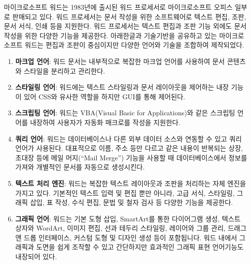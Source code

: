 \documentclass[
  letterpaper,
]{book}
\begin{document}
\begin{tcolorbox}[enhanced jigsaw, opacityback=0, opacitybacktitle=0.6, colback=white, rightrule=.15mm, coltitle=black, colframe=quarto-callout-note-color-frame, colbacktitle=quarto-callout-note-color!10!white, bottomrule=.15mm, bottomtitle=1mm, breakable, title=\textcolor{quarto-callout-note-color}{\faInfo}\hspace{0.5em}{마이크로소프트 워드}, titlerule=0mm, leftrule=.75mm, toptitle=1mm, left=2mm, arc=.35mm, toprule=.15mm]

마이크로소프트 워드는 1983년에 출시된 워드 프로세서로 마이크로소프트
오피스 일부로 판매되고 있다. 워드 프로세서는 문서 작성을 위한
소프트웨어로 텍스트 편집, 조판, 문서 서식, 인쇄 등을 지원한다. 워드
프로세서는 텍스트 편집과 조판 기능 외에도 문서 작성을 위한 다양한 기능을
제공한다. 아래한글과 기술기반을 공유하고 있는 마이크로소프트 워드는
편집과 조판이 중심이지만 다양한 언어와 기술을 조합하여 제작되었다.

\begin{enumerate}
\def\labelenumi{\arabic{enumi}.}
\item
  \textbf{마크업 언어}: 워드 문서는 내부적으로 복잡한 마크업 언어를
  사용하여 문서 콘텐츠와 스타일을 분리하고 관리한다.
\item
  \textbf{스타일링 언어}: 워드에는 텍스트 스타일링과 문서 레이아웃을
  제어하는 내장 기능이 있어 CSS와 유사한 역할을 하지만 GUI를 통해
  제어된다.
\item
  \textbf{스크립팅 언어}: 워드는 VBA(Visual Basic for Applications)와
  같은 스크립팅 언어를 내장하여 사용자가 자동화 매크로를 작성을
  지원한다.
\item
  \textbf{쿼리 언어}: 워드는 데이터베이스나 다른 외부 데이터 소스와
  연동할 수 있고 쿼리 언어가 사용된다. 대표적으로 이름, 주소 등만 다르고
  같은 내용이 반복되는 상장, 초대장 등에 메일 머지(``Mail Merge'')
  기능을 사용할 때 데이터베이스에서 정보를 가져와 개별적인 문서를
  자동으로 생성시킨다.
\item
  \textbf{텍스트 처리 엔진}: 워드는 복잡한 텍스트 레이아웃과 조판을
  처리하는 자체 엔진을 가지고 있다. 기본적인 텍스트 입력 및 편집 뿐만
  아니라, 고급 서식, 스타일링, 그래픽 삽입, 표 작성, 수식 편집, 문법 및
  철자 검사 등 다양한 기능을 제공한다.
\item
  \textbf{그래픽 언어}: 워드는 기본 도형 삽입, SmartArt를 통한
  다이어그램 생성, 텍스트 상자와 WordArt, 이미지 편집, 선과 테두리
  스타일링, 레이어와 그룹 관리, 드래그 앤 드롭 인터페이스, 커스텀 도형
  및 디자인 생성 등이 포함됩니다. 워드 내에서 그래픽과 도면을 쉽게
  조작할 수 있고 간단하지만 효과적인 그래픽 표현 언어기능도 내장되어
  있다.
\end{enumerate}

\end{tcolorbox}
\end{document}
